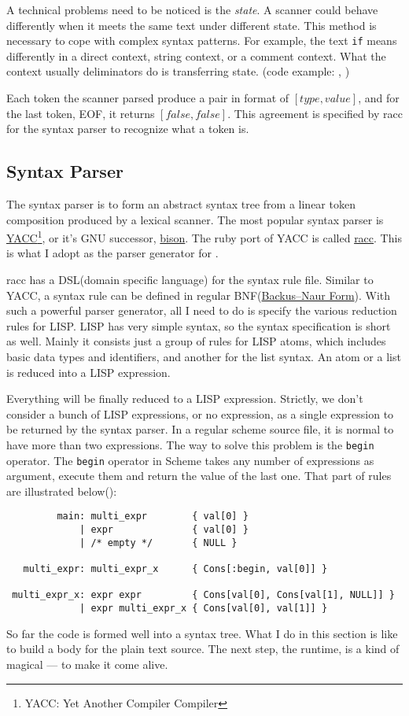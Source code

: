 A technical problems need to be noticed is the \emph{state}. A scanner could
behave differently when it meets the same text under different
state. This method is necessary to cope with complex syntax patterns.
For example, the text \verb+if+ means differently in a direct context,
string context, or a comment context. What the context usually
deliminators do is transferring state. (code example:
,
)

Each token the scanner parsed produce a pair in format of $[type,
value]$, and for the last token, EOF, it returns $[false,
false]$. This agreement is specified by racc for the syntax parser to
recognize what a token is.

\subsection{Syntax Parser}
The syntax parser is to form an abstract syntax tree from a linear token
composition produced by a lexical scanner. The most popular syntax
parser is
\href{http://dinosaur.compilertools.net/yacc/}{YACC}\footnote{YACC: Yet
  Another Compiler Compiler}, or it's GNU successor,
\href{https://www.gnu.org/software/bison/}{bison}. The ruby port of
YACC is called \href{https://github.com/tenderlove/racc}{racc}. This
is what I adopt as the parser generator for \revo.

racc has a DSL(domain specific language) for the syntax rule
file. Similar to YACC, a syntax rule can be defined in regular
BNF(\href{https://en.wikipedia.org/wiki/Backus-Naur_form}{Backus–Naur
  Form}). With such a powerful parser generator, all I need to do is
specify the various reduction rules for LISP. LISP has very simple
syntax, so the syntax specification is short as well. Mainly it
consists just a group of rules for LISP atoms, which includes basic
data types and identifiers, and another for the
list syntax. An atom or a list is reduced into a LISP expression.

Everything will be finally reduced to a LISP expression. Strictly, we
don't consider a bunch of LISP expressions, or no expression, as a single
expression to be returned by the syntax parser. In a regular scheme
source file, it is normal to have more than two expressions. The way
to solve this problem is the \verb+begin+ operator. The \verb+begin+
operator in Scheme takes any number of expressions as argument,
execute them and return the value of the last one. That part of rules
are illustrated below():
\begin{verbatim}
         main: multi_expr        { val[0] }
             | expr              { val[0] }
             | /* empty */       { NULL }

   multi_expr: multi_expr_x      { Cons[:begin, val[0]] }

 multi_expr_x: expr expr         { Cons[val[0], Cons[val[1], NULL]] }
             | expr multi_expr_x { Cons[val[0], val[1]] }
\end{verbatim}

So far the code is formed well into a syntax tree. What I do in this
section is like to build a body for the plain text source. The next
step, the runtime, is a kind of magical --- to make it come alive.
